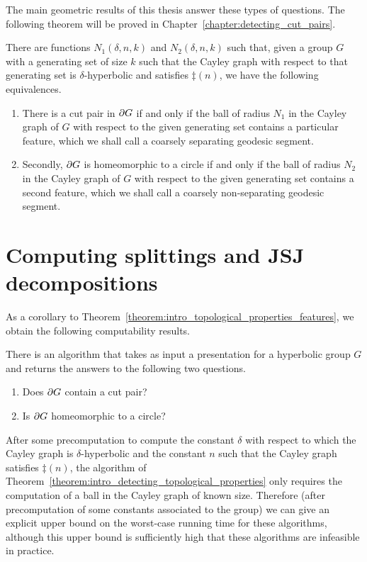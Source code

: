 The main geometric results of this thesis answer these types of questions.
The following theorem will be proved in Chapter~\ref{chapter:detecting_cut_pairs}.

\begin{theorem}\label{theorem:intro_topological_properties_features}
  There are functions $N_1(\delta, n, k)$ and $N_2(\delta, n, k)$ such that, given a group $G$ with a generating set of size $k$ such that the Cayley graph with respect to that generating set is $\delta$-hyperbolic and satisfies $\ddag(n)$, we have the following equivalences.
  \begin{enumerate}
    \item There is a cut pair in $\partial G$ if and only if the ball of radius $N_1$ in the Cayley graph of $G$ with respect to the given generating set contains a particular feature, which we shall call a coarsely separating geodesic segment.
    \item Secondly, $\partial G$ is homeomorphic to a circle if and only if the ball of radius $N_2$ in the Cayley graph of $G$ with respect to the given generating set contains a second feature, which we shall call a coarsely non-separating geodesic segment.
  \end{enumerate}
\end{theorem}

\section{Computing splittings and JSJ decompositions}

As a corollary to Theorem~\ref{theorem:intro_topological_properties_features}, we obtain the following computability results.

\begin{theorem}\label{theorem:intro_detecting_topological_properties}
  There is an algorithm that takes as input a presentation for a hyperbolic group $G$ and returns the answers to the following two questions.
  \begin{enumerate}
    \item Does $\partial G$ contain a cut pair?
    \item Is $\partial G$ homeomorphic to a circle?
  \end{enumerate}
\end{theorem}

After some precomputation to compute the constant $\delta$ with respect to which the Cayley graph is $\delta$-hyperbolic and the constant $n$ such that the Cayley graph satisfies $\ddag(n)$, the algorithm of Theorem~\ref{theorem:intro_detecting_topological_properties} only requires the computation of a ball in the Cayley graph of known size.
Therefore (after precomputation of some constants associated to the group) we can give an explicit upper bound on the worst-case running time for these algorithms, although this upper bound is sufficiently high that these algorithms are infeasible in practice. 

